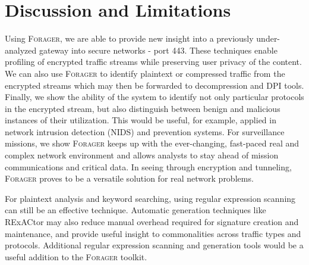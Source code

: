 \section{Discussion and Limitations}

Using \textsc{Forager}, we are able to provide new insight into a previously under-analyzed gateway into secure networks - port 443. These techniques enable profiling of encrypted traffic streams while preserving user privacy of the content. We can also use \textsc{Forager} to identify plaintext or compressed traffic from the encrypted streams which may then be forwarded to decompression and DPI tools. Finally, we show the ability of the system to identify not only particular protocols in the encrypted stream, but also distinguish between benign and malicious instances of their utilization. This would be useful, for example, applied in network intrusion detection (NIDS) and prevention systems. For surveillance missions, we show \textsc{Forager} keeps up with the ever-changing, fast-paced real and complex network environment and allows analysts to stay ahead of mission communications and critical data. In seeing through encryption and tunneling, \textsc{Forager} proves to be a versatile solution for real network problems.

For plaintext analysis and keyword searching, using regular expression scanning can still be an effective technique. Automatic generation techniques like RExACtor may also reduce manual overhead required for signature creation and maintenance, and provide useful insight to commonalities across traffic types and protocols. Additional regular expression scanning and generation tools would be a useful addition to the \textsc{Forager} toolkit.
